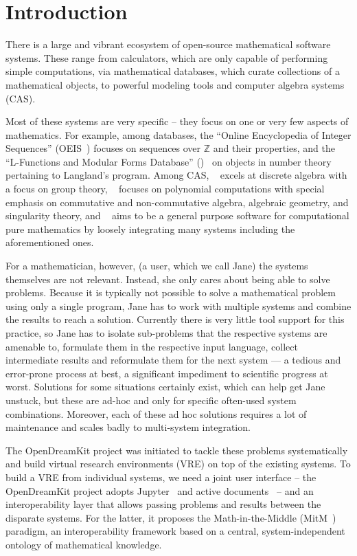 \section{Introduction}\label{sec:intro}

There is a large and vibrant ecosystem of open-source mathematical software systems. 
These range from calculators, which are only capable of performing simple computations, via mathematical databases, which curate collections of a mathematical objects, to powerful modeling tools and computer algebra systems (CAS).

Most of these systems are very specific -- they focus on one or very few aspects of mathematics.
For example, among databases, the ``Online Encyclopedia of Integer Sequences'' (OEIS~\cite{Sloane:oeis12,oeis}) focuses on sequences over $\mathbb{Z}$ and their properties, and the ``L-Functions and Modular Forms
Database'' (\LMFDB)~\cite{Cremona:LMFDB16,lmfdb:on} on objects in number theory pertaining to Langland's program.
 Among CAS, \GAP~\cite{GAP:on} excels at discrete algebra with a focus on group theory, \Singular~\cite{singular:on} focuses on polynomial computations with special emphasis on commutative and non-commutative algebra, algebraic geometry, and singularity theory, and \Sage~\cite{SageMath:on} aims to be a general purpose software for computational pure mathematics by loosely integrating many systems including the aforementioned ones.

For a mathematician, however, (a user, which we call Jane) the systems themselves are not relevant.
Instead, she only cares about being able to solve problems. 
Because it is typically not possible to solve a mathematical problem using only a single program, Jane has to work with multiple systems and combine the results to reach a solution. 
Currently there is very little tool support for this practice, so Jane has to isolate sub-problems that the respective systems are amenable to, formulate them in the respective input language, collect intermediate results and reformulate them for the next system --- a tedious and error-prone process at best, a significant impediment to scientific progress at worst.
Solutions for some situations certainly exist, which can help get Jane unstuck, but these are ad-hoc and only for specific often-used system combinations. 
Moreover, each of these ad hoc solutions requires a lot of maintenance and scales badly to multi-system integration. 

The OpenDreamKit project was initiated to tackle these problems systematically and build virtual research environments (VRE) on top of the existing systems.
To build a VRE from individual systems, we need a joint user interface -- the OpenDreamKit project adopts Jupyter~\cite{jupyter-project:on} and active documents~\cite{KohDavGin:psewads11} -- and an interoperability layer that allows passing problems and results between the disparate systems. 
For the latter, it proposes the Math-in-the-Middle (MitM~\cite{DehKohKon:iop16}) paradigm, an interoperability framework based on a central, system-independent ontology of mathematical knowledge.

